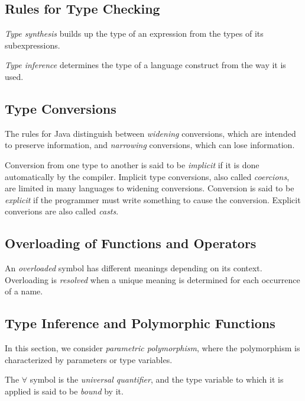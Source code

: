 \documentclass[12pt,a4paper,twoside,openany]{book}
\begin{document}
\subsection{Rules for Type Checking}

\textit{Type synthesis} builds up the type of an expression from the types of its subexpressions.

\textit{Type inference} determines the type of a language construct from the way it is used.

\subsection{Type Conversions}

The rules for Java distinguish between \textit{widening} conversions, which are intended to preserve information, and \textit{narrowing} conversions, which can lose information.

Conversion from one type to another is said to be \textit{implicit} if it is done automatically by the compiler. Implicit type conversions, also called \textit{coercions}, are limited in many languages to widening conversions. Conversion is said to be \textit{explicit} if the programmer must write something to cause the conversion. Explicit converions are also called \textit{casts}.

\subsection{Overloading of Functions and Operators}

An \textit{overloaded} symbol has different meanings depending on its context. Overloading is \textit{resolved} when a unique meaning is determined for each occurrence of a name.

\subsection{Type Inference and Polymorphic Functions}

In this section, we consider \textit{parametric polymorphism}, where the polymorphism is characterized by parameters or type variables.

The $\forall$ symbol is the \textit{universal quantifier}, and the type variable to which it is applied is said to be \textit{bound} by it.
\end{document}
